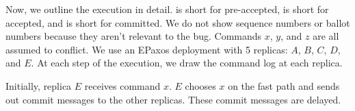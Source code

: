 \documentclass{mwhittaker}
\begin{document}
Now, we outline the execution in detail. \preaccepted{} is short for
pre-accepted, \accepted{} is short for accepted, and \committed{} is short for
committed. We do not show sequence numbers or ballot numbers because they
aren't relevant to the bug. Commands $x$, $y$, and $z$ are all assumed to
conflict. We use an EPaxos deployment with 5 replicas: $A$, $B$, $C$, $D$, and
$E$. At each step of the execution, we draw the command log at each replica.

Initially, replica $E$ receives command $x$. $E$ chooses $x$ on the fast path
and sends out commit messages to the other replicas. These commit messages are
delayed.
\begin{center}
\end{center}
\end{document}
